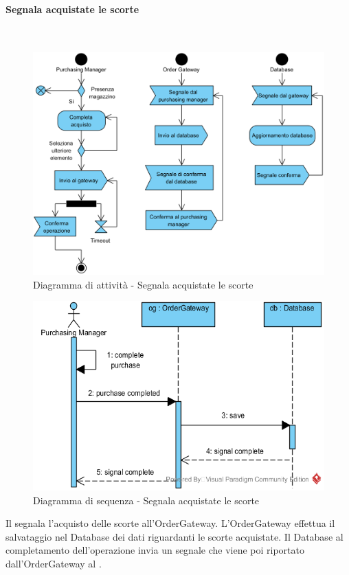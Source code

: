 \subsubsection{\Purchasingmanager{}}

\begin{samepage}
\paragraph{Segnala acquistate le scorte}\mbox{}\\
\begin{figure}[H]
	\centering
	\includegraphics[width=14cm]{diagrammi_img/attivita/responsabile_acquisto.png}
	\caption{Diagramma di attività - Segnala acquistate le scorte}
\end{figure}
\end{samepage}
\begin{figure}[H]
	\centering
	\includegraphics[width=14cm]{../../documenti/SpecificaTecnica/diagrammi_img/sequenza/responsabile_acquisti_segnala_scorte_acquistate.png}
	\caption{Diagramma di sequenza - Segnala acquistate le scorte}
\end{figure}
Il \Purchasingmanager{} segnala l'acquisto delle scorte all'Order\-Gateway. L'Order\-Gateway effettua il salvataggio nel Database dei dati riguardanti le scorte acquistate. Il Database al completamento dell'operazione invia un segnale che viene poi riportato dall'Order\-Gateway al \Purchasingmanager{}.


